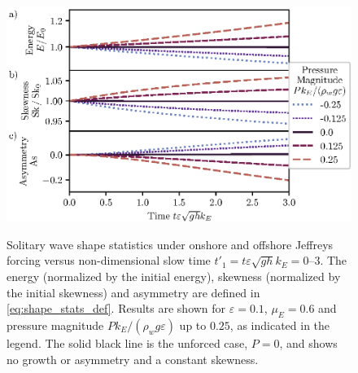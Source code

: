 \documentclass{jfm}
\renewcommand*{\epsilon}{\varepsilon}
\begin{document}
\begin{figure}
  \centering
  { %
    \label{fig:statistics_solitary:a}
    \label{fig:statistics_solitary:b}
    \label{fig:statistics_solitary:c}
  }
  \includegraphics{Skew-Asymm-Production.eps}
  \caption{
    Solitary wave shape statistics under onshore and offshore
    Jeffreys forcing versus non-dimensional slow time $t'_1 = t
    \epsilon \sqrt{gh} k_E = \numrange{0}{3}$.
    The
    energy (normalized by the initial energy),
    skewness (normalized by the initial skewness) and
    asymmetry are defined in
    \cref{eq:shape_stats_def}.
    Results are shown for $\epsilon=0.1$, $\mu_E = 0.6$ and pressure
    magnitude $P k_E/(\rho_w g \epsilon)$ up to $0.25$, as indicated in
    the legend.
    The solid black line is the unforced case, $P = 0$, and
    shows no growth or asymmetry and a constant skewness.
  }\label{fig:statistics_solitary}
\end{figure}
\end{document}
